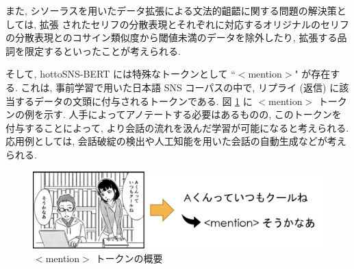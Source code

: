 \begin{table}[!h]
\vspace{20mm}
\caption{シソーラスを用いたデータ拡張による文法的齟齬}
\label{table:sogo}
\centering
{}
\vspace{10mm}
\end{table}

\newpage

また, シソーラスを用いたデータ拡張による文法的齟齬に関する問題の解決策としては, 拡張
されたセリフの分散表現とそれぞれに対応するオリジナルのセリフの分散表現とのコサイン類似度から閾値未満のデータを除外したり, 拡張する品詞を限定するといったことが考えられる.

そして, hottoSNS-BERT には特殊なトークンとして ``$<$mention$>$" が存在する. これは, 事前学習で用いた日本語 SNS コーパスの中で, リプライ (返信) に該当するデータの文頭に付与されるトークンである. 図 \ref{fig:mention} に $<$mention$>$ トークンの例を示す. 人手によってアノテートする必要はあるものの, このトークンを付与することによって, より会話の流れを汲んだ学習が可能になると考えられる. 応用例としては, 会話破綻の検出や人工知能を用いた会話の自動生成などが考えられる.

\begin{figure}[!h]
  \vspace{20mm}
  \centering
  \includegraphics[width=1.0\hsize]{doc/figures/mention.png}
  \caption{$<$mention$>$ トークンの概要}
  \label{fig:mention}
\end{figure}


